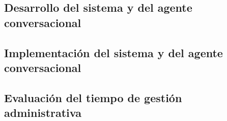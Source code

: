 
\subsection{Desarrollo del sistema y del agente conversacional}
\label{sec:ob3_desarrollo}








\subsection{Implementación del sistema y del agente conversacional}
\label{sec:ob3_implementacion}







% 

\subsection{Evaluación del tiempo de gestión administrativa}
\label{sec:ob3_evaluacion}


